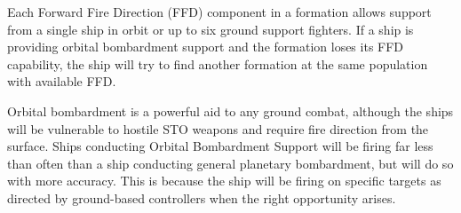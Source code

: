 \documentclass[../../Aurora C# unofficial manual.tex]{subfiles}
\begin{document}
	Each Forward Fire Direction (FFD) component in a formation allows support from a single ship in orbit or up to six ground support fighters. If a ship is providing orbital bombardment support and the formation loses its FFD capability, the ship will try to find another formation at the same population with available FFD.
	
	Orbital bombardment is a powerful aid to any ground combat, although the ships will be vulnerable to hostile STO weapons and require fire direction from the surface. Ships conducting Orbital Bombardment Support will be firing far less than often than a ship conducting general planetary bombardment, but will do so with more accuracy. This is because the ship will be firing on specific targets as directed by ground-based controllers when the right opportunity arises.	
\end{document}
